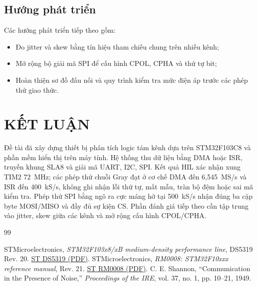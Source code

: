 \section{Hướng phát triển}\label{hux1b0ux1edbng-phuxe1t-triux1ec3n}

Các hướng phát triển tiếp theo gồm:
\begin{itemize}
\item Đo jitter và skew bằng tín hiệu tham chiếu chung trên nhiều kênh;
\item Mở rộng bộ giải mã SPI để cấu hình CPOL, CPHA và thứ tự bit;
\item Hoàn thiện sơ đồ đấu nối và quy trình kiểm tra mức điện áp trước các phép thử giao thức.
\end{itemize}

\chapter{KẾT LUẬN}\label{kux1ebft-luux1eadn}

Đề tài đã xây dựng thiết bị phân tích logic tám kênh dựa trên STM32F103C8 và phần mềm hiển thị trên máy tính. Hệ thống thu dữ liệu bằng DMA hoặc ISR, truyền khung SLA8 và giải mã UART, I2C, SPI. Kết quả HIL xác nhận xung TIM2 72~MHz; các phép thử chuỗi Gray đạt ở cơ chế DMA đến 6,545~MS/s và ISR đến 400~kS/s, không ghi nhận lỗi thứ tự, mất mẫu, tràn bộ đệm hoặc sai mã kiểm tra. Phép thử SPI bằng ngõ ra cực máng hở tại 500~kS/s nhận đúng ba cặp byte MOSI/MISO và đầy đủ sự kiện CS. Phần đánh giá tiếp theo cần tập trung vào jitter, skew giữa các kênh và mở rộng cấu hình CPOL/CPHA.

\renewcommand{\bibname}{TÀI LIỆU THAM KHẢO}
\begin{thebibliography}{99}
{}
 STMicroelectronics, \emph{STM32F103x8/xB medium-density performance line}, DS5319 Rev. 20. \href{https://www.st.com/resource/en/datasheet/CD00161566.pdf}{ST DS5319 (PDF)}.
 STMicroelectronics, \emph{RM0008: STM32F10xxx reference manual}, Rev. 21. \href{https://www.st.com/resource/en/reference_manual/cd00171190-stm32f101xx-stm32f102xx-stm32f103xx-stm32f105xx-and-stm32f107xx-advanced-arm-based-32-bit-mcus-stmicroelectronics.pdf}{ST RM0008 (PDF)}.
 C. E. Shannon, “Communication in the Presence of Noise,” \emph{Proceedings of the IRE}, vol. 37, no. 1, pp. 10--21, 1949.
\end{thebibliography}
